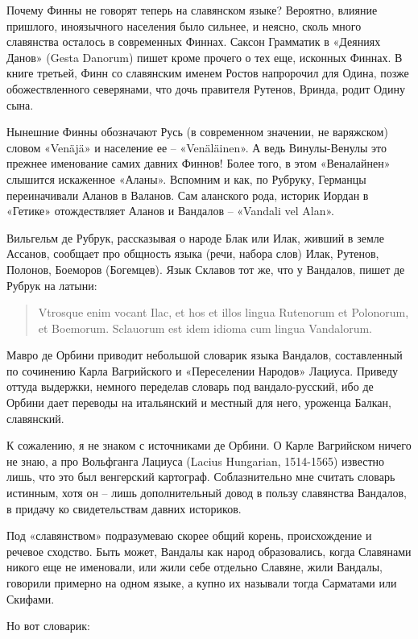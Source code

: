 Почему Финны не говорят теперь на славянском языке? Вероятно, влияние пришлого, иноязычного населения было сильнее, и неясно, сколь много славянства осталось в современных Финнах. Саксон Грамматик в «Деяниях Данов» (Gesta Danorum) пишет кроме прочего о тех еще, исконных Финнах. В книге третьей, Финн со славянским именем Ростов напророчил для Одина, позже обожествленного северянами, что дочь правителя Рутенов, Вринда, родит Одину сына.

Нынешние Финны обозначают Русь (в современном значении, не варяжском) словом «Venäjä» и население ее – «Venäläin\-en». А ведь Винулы-Венулы это прежнее именование самих давних Финнов! Более того, в этом «Веналайнен» слышится искаженное «Аланы». Вспомним и как, по Рубруку, Германцы переиначивали Аланов в Валанов. Сам аланского рода, историк Иордан в «Гетике» отождествляет Аланов и Вандалов – «Vandali vel Alan».

Вильгельм де Рубрук, рассказывая о народе Блак или Илак, живший в земле Ассанов, сообщает про общность языка (речи, набора слов) Илак, Рутенов, Полонов, Боеморов (Богемцев). Язык Склавов тот же, что у Вандалов, пишет де Рубрук на латыни:

\begin{quotation}
Vtrosque enim vocant Ilac, et hos et illos lingua Rutenorum et Polonorum, et Boemorum. Sclauorum est idem idioma cum lingua Vandalorum.
\end{quotation}

Мавро де Орбини приводит небольшой словарик языка Вандалов, составленный по сочинению Карла Вагрийского и «Переселении Народов» Лациуса. Приведу оттуда выдержки, немного переделав словарь под вандало-русский, ибо де Орбини дает переводы на итальянский и местный для него, уроженца Балкан, славянский. 

К сожалению, я не знаком с источниками де Орбини. О Карле Вагрийском ничего не знаю, а про Вольфганга Лациуса (Lacius Hungarian, 1514-1565) известно лишь, что это был венгерский картограф. Соблазнительно мне считать словарь истинным, хотя он – лишь дополнительный довод в пользу славянства Вандалов, в придачу ко свидетельствам давних историков. 

Под «славянством» подразумеваю скорее общий корень, происхождение и речевое сходство. Быть может, Вандалы как народ образовались, когда Славянами никого еще не именовали, или жили себе отдельно Славяне, жили Вандалы, говорили примерно на одном языке, а купно их называли тогда Сарматами или Скифами.

Но вот словарик:

